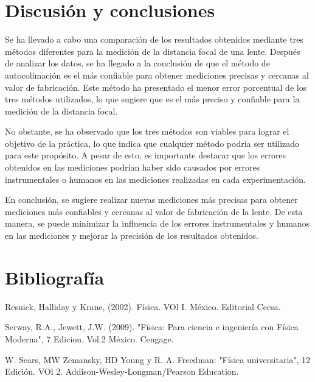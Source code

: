 \documentclass[10pt,journal]{IEEEtran}
\begin{document}
\section{Discusión y conclusiones}

Se ha llevado a cabo una comparación de los resultados obtenidos mediante tres métodos diferentes para la medición de la distancia focal de una lente. Después de analizar los datos, se ha llegado a la conclusión de que el método de autocolimación es el más confiable para obtener mediciones precisas y cercanas al valor de fabricación. Este método ha presentado el menor error porcentual de los tres métodos utilizados, lo que sugiere que es el más preciso y confiable para la medición de la distancia focal.

No obstante, se ha observado que los tres métodos son viables para lograr el objetivo de la práctica, lo que indica que cualquier método podría ser utilizado para este propósito. A pesar de esto, es importante destacar que los errores obtenidos en las mediciones podrían haber sido causados por errores instrumentales o humanos en las mediciones realizadas en cada experimentación.

En conclusión, se sugiere realizar nuevas mediciones más precisas para obtener mediciones más confiables y cercanas al valor de fabricación de la lente. De esta manera, se puede minimizar la influencia de los errores instrumentales y humanos en las mediciones y mejorar la precisión de los resultados obtenidos.

\section{Bibliografía}


Resnick, Halliday y Krane, (2002). Física. VOl I. México. Editorial Cecsa.


Serway, R.A., Jewett, J.W. (2009). "Física: Para ciencia e ingeniería con Física Moderna", 7 Edicion. Vol.2 México. Cengage.


W. Sears, MW Zemansky, HD Young y R. A. Freedman: "Física universitaria", 12 Edición. VOl 2. Addison-Wesley-Longman/Pearson Education.
\end{document}
